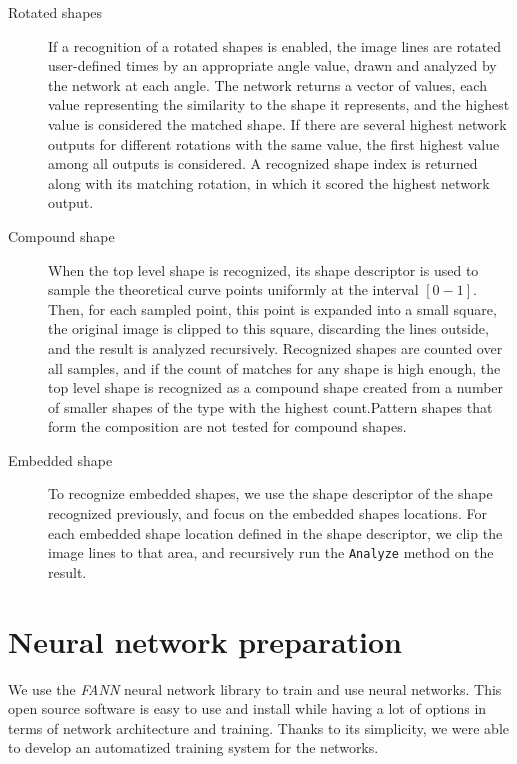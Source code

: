 \begin{description}
\item [Rotated shapes] If a recognition of a rotated shapes is enabled, the image lines are rotated user-defined times by an appropriate angle value, drawn and analyzed by the network at each angle. The network returns a vector of values, each value representing the similarity to the shape it represents, and the highest value is considered the matched shape. If there are several highest network outputs for different rotations with the same value, the first highest value among all outputs is considered. A recognized shape index is returned along with its matching rotation, in which it scored the highest network output.

\item[Compound shape]
When the top level shape is recognized, its shape descriptor is used to sample the theoretical curve points uniformly at the interval $[0-1]$. Then, for each sampled point, this point is expanded into a small square, the original image is clipped to this square, discarding the lines outside, and the result is analyzed recursively. Recognized shapes are counted over all samples, and if the count of matches for any shape is high enough, the top level shape is recognized as a compound shape created from a number of smaller shapes of the type with the highest count.Pattern shapes that form the composition are not tested for compound shapes.

\item [Embedded shape]
To recognize embedded shapes, we use the shape descriptor of the shape recognized previously, and focus on the embedded shapes locations. For each embedded shape location defined in the shape descriptor, we clip the image lines to that area, and recursively run the \texttt{Analyze} method on the result.

\end{description}

\section{Neural network preparation}
We use the \emph{FANN} neural network library to train and use neural networks. This open source software is easy to use and install while having a lot of options in terms of network architecture and training. Thanks to its simplicity, we were able to develop an automatized training system for the networks.

